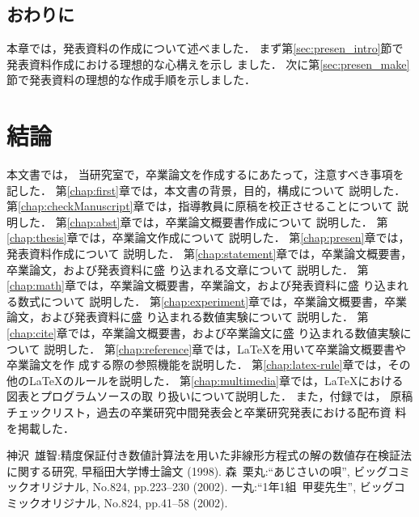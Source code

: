 \documentclass[a4j,12pt,dvipdfmx,oneside]{jsbook}
\theoremstyle{definition}
\begin{document}
\section{おわりに}\label{sec:presen_summary}
本章では，発表資料の作成について述べました．
まず第\ref{sec:presen_intro}節で発表資料作成における理想的な心構えを示し
ました．
次に第\ref{sec:presen_make}節で発表資料の理想的な作成手順を示しました．
%
%
%
%
\chapter{結論}\label{chap:conclusion}
本文書では，
当研究室で，卒業論文を作成するにあたって，注意すべき事項を記した．
第\ref{chap:first}章では，本文書の背景，目的，構成について
説明した．
第\ref{chap:checkManuscript}章では，指導教員に原稿を校正させることについて
説明した．
第\ref{chap:abst}章では，卒業論文概要書作成について
説明した．
第\ref{chap:thesis}章では，卒業論文作成について
説明した．
第\ref{chap:presen}章では，発表資料作成について
説明した．
第\ref{chap:statement}章では，卒業論文概要書，卒業論文，および発表資料に盛
り込まれる文章について
説明した．
第\ref{chap:math}章では，卒業論文概要書，卒業論文，および発表資料に盛
り込まれる数式について
説明した．
第\ref{chap:experiment}章では，卒業論文概要書，卒業論文，および発表資料に盛
り込まれる数値実験について
説明した．
第\ref{chap:cite}章では，卒業論文概要書，および卒業論文に盛
り込まれる数値実験について
説明した．
第\ref{chap:reference}章では，\LaTeX{}を用いて卒業論文概要書や卒業論文を作
成する際の参照機能を説明した．
第\ref{chap:latex-rule}章では，その他の\LaTeX{}のルールを説明した．
第\ref{chap:multimedia}章では，\LaTeX{}における図表とプログラムソースの取
り扱いについて説明した．
また，付録では，
原稿チェックリスト，過去の卒業研究中間発表会と卒業研究発表における配布資
料を掲載した．
%
%
%
%
%
%
\begin{thebibliography}{99}
神沢~雄智:精度保証付き数値計算法を用いた非線形方程式の解の数値存在検証法に関する研究, 早稲田大学博士論文 (1998).
森~栗丸:``あじさいの唄'', ビッグコミックオリジナル, No.824, pp.223--230 (2002).
一丸:``1年1組~甲斐先生'', ビッグコミックオリジナル, No.824, pp.41--58 (2002).
\end{thebibliography}
\end{document}
